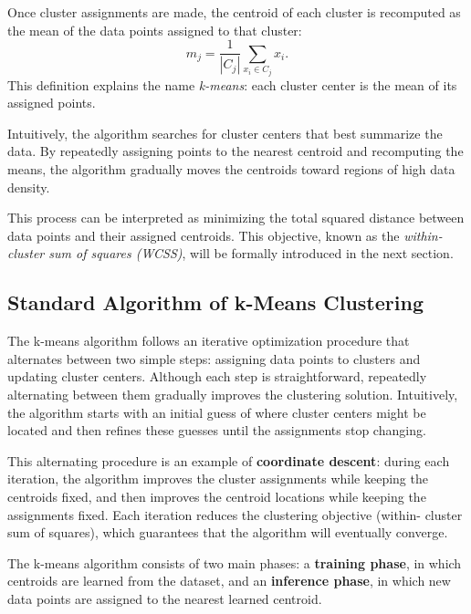 \documentclass{article}
\begin{document}
Once cluster assignments are made, the centroid of each cluster is recomputed as
the mean of the data points assigned to that cluster:
\[
m_j = \frac{1}{|C_j|} \sum_{x_i \in C_j} x_i.
\]
This definition explains the name \emph{k-means}: each cluster center is the mean
of its assigned points.

Intuitively, the algorithm searches for cluster centers that best summarize the
data. By repeatedly assigning points to the nearest centroid and recomputing the
means, the algorithm gradually moves the centroids toward regions of high data
density.

This process can be interpreted as minimizing the total squared distance between
data points and their assigned centroids. This objective, known as the
\emph{within-cluster sum of squares (WCSS)}, will be formally introduced in the
next section.


\subsection{Standard Algorithm of k-Means Clustering}

The k-means algorithm follows an iterative optimization procedure that alternates
between two simple steps: assigning data points to clusters and updating cluster
centers. Although each step is straightforward, repeatedly alternating between
them gradually improves the clustering solution. Intuitively, the algorithm
starts with an initial guess of where cluster centers might be located and then
refines these guesses until the assignments stop changing.

This alternating procedure is an example of \textbf{coordinate descent}: during
each iteration, the algorithm improves the cluster assignments while keeping the
centroids fixed, and then improves the centroid locations while keeping the
assignments fixed. Each iteration reduces the clustering objective (within-
cluster sum of squares), which guarantees that the algorithm will eventually
converge.

The k-means algorithm consists of two main phases: a \textbf{training phase}, in
which centroids are learned from the dataset, and an \textbf{inference phase}, in
which new data points are assigned to the nearest learned centroid.
\end{document}
